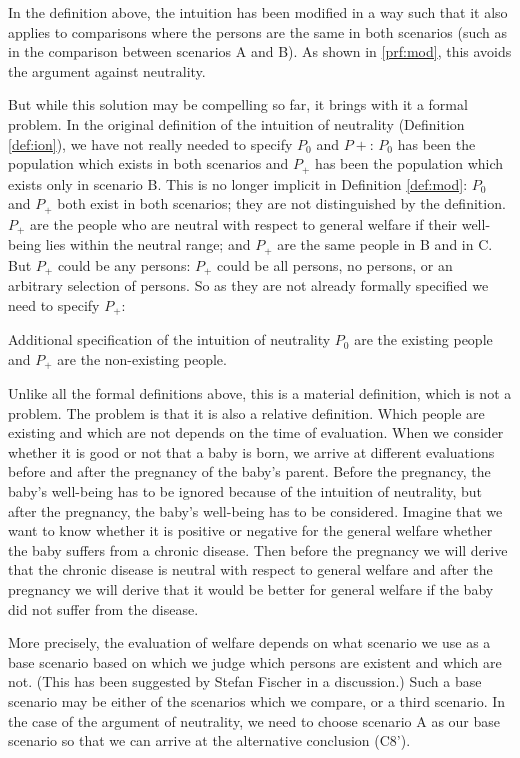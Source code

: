 In the definition above, the intuition has been modified in a way such that it also applies to comparisons where the persons are the same in both scenarios (such as in the comparison between scenarios A and B). As shown in \ref{prf:mod}, this avoids the argument against neutrality. 

But while this solution may be compelling so far, it brings with it a formal problem. In the original definition of the intuition of neutrality (Definition \ref{def:ion}), we have not really needed to specify $P_0$ and $P+$: $P_0$ has been the population which exists in both scenarios and $P_+$ has been the population which exists only in scenario B. This is no longer implicit in Definition \ref{def:mod}: $P_0$ and $P_+$ both exist in both scenarios; they are not distinguished by the definition. $P_+$ are the people who are neutral with respect to general welfare if their well-being lies within the neutral range; and $P_+$ are the same people in B and in C. But $P_+$ could be any persons: $P_+$ could be all persons, no persons, or an arbitrary selection of persons. So as they are not already formally specified we need to specify $P_+$:

\begin{Definition}{Additional specification of the intuition of neutrality}{}
$P_0$ are the existing people and $P_+$ are the non-existing people.
\end{Definition}

Unlike all the formal definitions above, this is a material definition, which is not a problem. The problem is that it is also a relative definition. Which people are existing and which are not depends on the time of evaluation. When we consider whether it is good or not that a baby is born, we arrive at different evaluations before and after the pregnancy of the baby's parent. Before the pregnancy, the baby's well-being has to be ignored because of the intuition of neutrality, but after the pregnancy, the baby's well-being has to be considered. Imagine that we want to know whether it is positive or negative for the general welfare whether the baby suffers from a chronic disease. Then before the pregnancy we will derive that the chronic disease is neutral with respect to general welfare and after the pregnancy we will derive that it would be better for general welfare if the baby did not suffer from the disease.  

More precisely, the evaluation of welfare depends on what scenario we use as a base scenario based on which we judge which persons are existent and which are not. (This has been suggested by Stefan Fischer in a discussion.) Such a base scenario may be either of the scenarios which we compare, or a third scenario. In the case of the argument of neutrality, we need to choose scenario A as our base scenario so that we can arrive at the alternative conclusion (C8’). 

